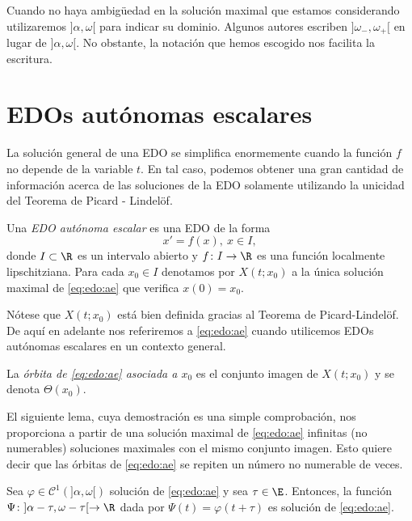 \documentclass{article}
\begin{document}
Cuando no haya ambigüedad en la solución maximal que estamos considerando utilizaremos
$]\alpha, \omega[$ para indicar su dominio. Algunos autores escriben $]\omega_-, \omega_+[$ en lugar
de $]\alpha, \omega[$. No obstante, la notación que hemos escogido nos facilita la escritura.

\newpage

\section{EDOs autónomas escalares}

La solución general de una EDO se simplifica enormemente cuando la función $f$ no depende de la
variable $t$. En tal caso, podemos obtener una gran cantidad de información acerca de las soluciones
de la EDO solamente utilizando la unicidad del Teorema de Picard - Lindelöf.

\begin{definition}
  Una \emph{EDO autónoma escalar} es una EDO de la forma
  \begin{equation}
    \label{eq:edo:ae}
    x' = f(x), \ x \in I,
    \tag{AE}
  \end{equation}
  donde $I \subset \R$ es un intervalo abierto y $f \colon I \to \R$ es una función localmente
  lipschitziana. Para cada $x_0 \in I$ denotamos por $X(t; x_0)$ a la única solución maximal de
  \eqref{eq:edo:ae} que verifica $x(0) = x_0$.
\end{definition}

Nótese que $X(t; x_0)$ está bien definida gracias al Teorema de Picard-Lindelöf. De aquí en adelante
nos referiremos a \eqref{eq:edo:ae} cuando utilicemos EDOs autónomas escalares en un contexto
general.

\begin{definition}
  La \emph{órbita de \eqref{eq:edo:ae} asociada a $x_0$} es el conjunto imagen de $X(t; x_0)$ y se
  denota $\Theta(x_0)$.
\end{definition}

El siguiente lema, cuya demostración es una simple comprobación, nos proporciona a partir de una
solución maximal de \eqref{eq:edo:ae} infinitas (no numerables) soluciones maximales con el mismo
conjunto imagen. Esto quiere decir que las órbitas de \eqref{eq:edo:ae} se repiten un número no
numerable de veces.

\begin{lemma} \label{lem:ae:trans} Sea $\varphi \in \mathcal{C}^1(]\alpha, \omega[)$ solución de
  \eqref{eq:edo:ae} y sea $\tau \in \E$. Entonces, la función
  $\Psi \colon ]\alpha-\tau, \omega-\tau[ \to \R$ dada por $\Psi(t) = \varphi(t+\tau)$ es solución
  de \eqref{eq:edo:ae}.
\end{lemma}
\end{document}
